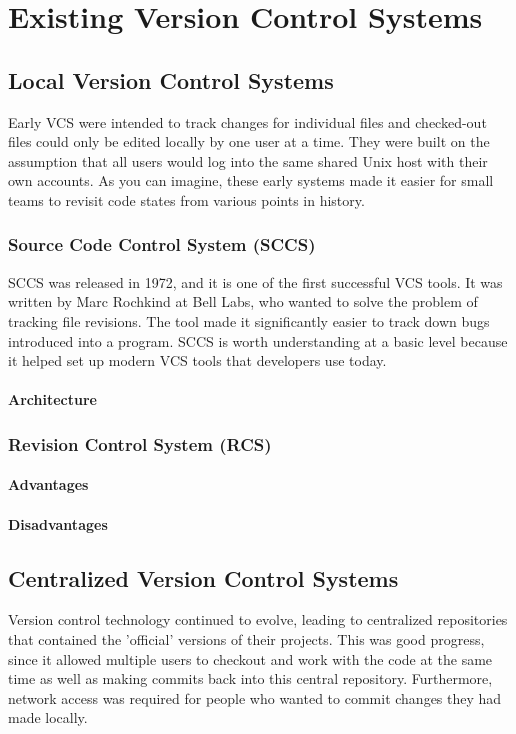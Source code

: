 \section{Existing Version Control Systems}
\subsection{Local Version Control Systems}
Early VCS were intended to track changes for individual files and checked-out files could only be edited locally by one user at a time. They were built on the assumption that all users would log into the same shared Unix host with their own accounts. As you can imagine, these early systems made it easier for small teams to revisit code states from various points in history.
\subsubsection{Source Code Control System (SCCS)}
SCCS was released in 1972, and it is one of the first successful VCS tools. It was written by Marc Rochkind at Bell Labs, who wanted to solve the problem of tracking file revisions. The tool made it significantly easier to track down bugs introduced into a program. SCCS is worth understanding at a basic level because it helped set up modern VCS tools that developers use today.
\paragraph{Architecture}
\subsubsection{Revision Control System (RCS)}
\paragraph{Advantages}
\paragraph{Disadvantages}
\subsection{Centralized Version Control Systems}
Version control technology continued to evolve, leading to centralized repositories that contained the 'official' versions of their projects. This was good progress, since it allowed multiple users to checkout and work with the code at the same time as well as making commits back into this central repository. Furthermore, network access was required for people who wanted to commit changes they had made locally.
